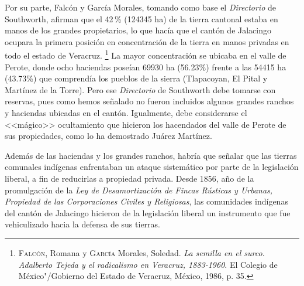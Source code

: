 \documentclass[14pt,twoside,final]{extbook} %
\let\oldfootnote\footnote
\renewcommand\footnote[1]{%
\oldfootnote{\hspace{1mm}#1}}
\begin{document}
Por su parte, Falcón y García Morales, tomando como base el \emph{Directorio} de Southworth, afirman que el 42\,\% (124345 ha) de la tierra cantonal estaba en manos de los grandes propietarios, lo que hacía que el cantón de Jalacingo ocupara la primera posición en concentración de la tierra en manos privadas en todo el estado de Veracruz.\footnote{\textsc{Falcón}, Romana y \textsc{García} Morales, Soledad. \emph{La semilla en el surco. Adalberto Tejeda y el radicalismo en Veracruz, 1883-1960}. El Colegio de México"/Gobierno del Estado de Veracruz, México, 1986, p. 35.} La mayor concentración se ubicaba en el valle de Perote, donde ocho haciendas poseían 69930 ha (56.23\%) frente a las 54415 ha (43.73\%) que comprendía los pueblos de la sierra (Tlapacoyan, El Pital y Martínez de la Torre). Pero ese \emph{Directorio} de Southworth debe tomarse con reservas, pues como hemos señalado no
fueron incluidos algunos grandes ranchos y haciendas ubicadas en el cantón. Igualmente, debe considerarse el <<mágico>> ocultamiento que hicieron los hacendados del valle de Perote de sus propiedades, como lo ha demostrado Juárez Martínez.

Además de las haciendas y los grandes ranchos, habría que señalar que las tierras comunales indígenas enfrentaban un ataque sistemático por parte de la legislación liberal, a fin de reducirlas a propiedad privada. Desde 1856, año de la promulgación de la \emph{Ley de Desamortización de Fincas Rústicas y Urbanas, Propiedad de las Corporaciones Civiles y Religiosas}, las comunidades indígenas del cantón de Jalacingo hicieron de la legislación liberal un instrumento que fue vehiculizado hacia la defensa de sus tierras.
\end{document}

